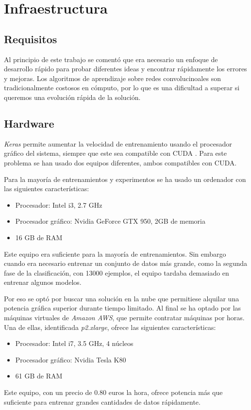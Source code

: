
\chapter{Infraestructura} 
\label{ap:hardware}

\section{Requisitos}

Al principio de este trabajo se comentó que era necesario un enfoque de desarrollo rápido para probar diferentes ideas y encontrar rápidamente los errores y mejoras. Los algoritmos de aprendizaje sobre redes convolucinoales son tradicionalmente costosos en cómputo, por lo que es una dificultad a superar si queremos una evolución rápida de la solución.

\section{Hardware}

\textit{Keras} permite aumentar la velocidad de entrenamiento usando el
procesador gráfico del sistema, siempre que este sea compatible con CUDA \parencite{cuda}.
Para este problema se han usado dos equipos diferentes, ambos compatibles con
CUDA.

Para la mayoría de entrenamientos y experimentos se ha usado un ordenador con las siguientes características:

\begin{itemize}
    \item{Procesador: Intel i3, 2.7 GHz}
    \item{Procesador gráfico: Nvidia GeForce GTX 950, 2GB de memoria}
    \item{16 GB de RAM}
\end{itemize}

Este equipo era suficiente para la mayoría de entrenamientos. Sin embargo cuando era necesario entrenar un conjunto de datos más grande, como la segunda fase de la clasificación, con 13000 ejemplos, el equipo tardaba demasiado en entrenar algunos modelos.

Por eso se optó por buscar una solución en la nube que permitiese alquilar una potencia gráfica superior durante tiempo limitado. Al final se ha optado por las máquinas virtuales de \textit{Amazon AWS}, que permite contratar máquinas por horas. Una de ellas, identificada \textit{p2.xlarge}, ofrece las siguientes características:

\begin{itemize}
    \item{Procesador: Intel i7, 3.5 GHz, 4 núcleos}
    \item{Procesador gráfico: Nvidia Tesla K80}
    \item{61 GB de RAM}
\end{itemize}

Este equipo, con un precio de 0.80 euros la hora, ofrece potencia más que suficiente para entrenar grandes cantidades de datos rápidamente.

